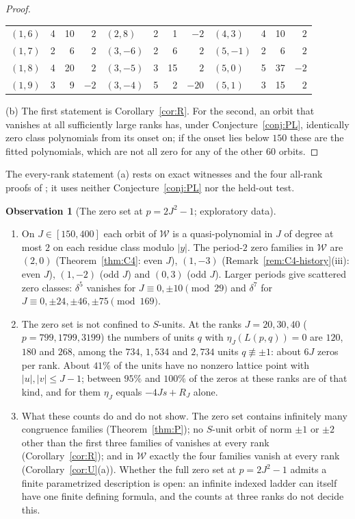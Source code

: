 \documentclass[11pt]{article}
\theoremstyle{definition}
\newtheorem{observation}[theorem]{Observation}
\begin{document}
\begin{proof}
\begin{center}
\begin{tabular}{@{}lrrr@{\qquad}lrrr@{\qquad}lrrr@{}}
$(1,6)$ & 4 & 10 & $2$ & $(2,8)$ & 2 & 1 & $-2$ & $(4,3)$ & 4 & 10 & $2$\\
$(1,7)$ & 2 & 6 & $2$ & $(3,-6)$ & 2 & 6 & $2$ & $(5,-1)$ & 2 & 6 & $2$\\
$(1,8)$ & 4 & 20 & $2$ & $(3,-5)$ & 3 & 15 & $2$ & $(5,0)$ & 5 & 37 & $-2$\\
$(1,9)$ & 3 & 9 & $-2$ & $(3,-4)$ & 5 & 2 & $-20$ & $(5,1)$ & 3 & 15 & $2$\\
\bottomrule
\end{tabular}
\end{center}
(b) The first statement is Corollary~\ref{cor:R}.  For the second, an
orbit that vanishes at all sufficiently large ranks has, under
Conjecture~\ref{conj:PL}, identically zero class polynomials from its
onset on; if the onset lies below $150$ these are the fitted
polynomials, which are not all zero for any of the other $60$ orbits.
\end{proof}

The every-rank statement (a) rests on exact witnesses and the four
all-rank proofs of \cite{MahmoodP1Collection2026}; it uses neither
Conjecture~\ref{conj:PL} nor the held-out test.

\begin{observation}[The zero set at $p=2J^2-1$; exploratory data]
\label{obs:window}
\begin{enumerate}[label=(\alph*)]
\item On $J\in[150,400]$ each orbit of $\mathcal W$ is a quasi-polynomial
in $J$ of degree at most $2$ on each residue class modulo $|y|$.  The
period-$2$ zero families in $\mathcal W$ are $(2,0)$
(Theorem~\ref{thm:C4}: even $J$), $(1,-3)$
(Remark~\ref{rem:C4-history}(iii): even $J$), $(1,-2)$ (odd $J$) and
$(0,3)$ (odd $J$).  Larger periods give scattered zero classes:
$\delta^5$ vanishes for $J\equiv0,\pm10\pmod{29}$ and $\delta^7$ for
$J\equiv0,\pm24,\pm46,\pm75\pmod{169}$.
\item The zero set is not confined to $S$-units.  At the ranks
$J=20,30,40$ ($p=799,1799,3199$) the numbers of units $q$ with
$\eta_J(L(p,q))=0$ are $120$, $180$ and $268$, among the $734$, $1{,}534$
and $2{,}734$ units $q\not\equiv\pm1$: about $6J$ zeros per rank.  About $41\%$ of
the units have no nonzero lattice point with $|u|,|v|\leq J-1$; between
$95\%$ and $100\%$ of the zeros at these ranks are of that kind, and for
them $\eta_J$ equals $-4Js+R_J$ alone.
\item What these counts do and do not show.  The zero set contains
infinitely many congruence families (Theorem~\ref{thm:P}); no $S$-unit
orbit of norm $\pm1$ or $\pm2$ other than the first three families of
\cite[Thm.~7.1]{MahmoodP1Collection2026} vanishes at every rank
(Corollary~\ref{cor:R}); and in $\mathcal W$ exactly the four families
vanish at every rank (Corollary~\ref{cor:U}(a)).  Whether the full zero
set at $p=2J^2-1$ admits a finite parametrized description is open: an
infinite indexed ladder can itself have one finite defining formula,
and the counts at three ranks do not decide this.
\end{enumerate}
\end{observation}
\end{document}
